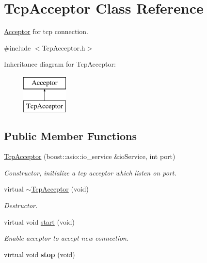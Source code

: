 \hypertarget{class_tcp_acceptor}{\section{Tcp\-Acceptor Class Reference}
\label{class_tcp_acceptor}
}


\hyperlink{class_acceptor}{Acceptor} for tcp connection.  




{\ttfamily \#include $<$Tcp\-Acceptor.\-h$>$}

Inheritance diagram for Tcp\-Acceptor\-:\begin{figure}[H]
\begin{center}
\leavevmode
\includegraphics[height=2.000000cm]{class_tcp_acceptor}
\end{center}
\end{figure}
\subsection*{Public Member Functions}
\begin{DoxyCompactItemize}
\item 
\hyperlink{class_tcp_acceptor_a71bbd613ee35e20b7db858c173fd52c0}{Tcp\-Acceptor} (boost\-::asio\-::io\-\_\-service \&io\-Service, int port)
\begin{DoxyCompactList}\small\item\em Constructor, initialize a tcp acceptor which listen on port. \end{DoxyCompactList}\item 
\hypertarget{class_tcp_acceptor_affefddc37347a117e5a51dfe86cd781f}{virtual \hyperlink{class_tcp_acceptor_affefddc37347a117e5a51dfe86cd781f}{$\sim$\-Tcp\-Acceptor} (void)}\label{class_tcp_acceptor_affefddc37347a117e5a51dfe86cd781f}

\begin{DoxyCompactList}\small\item\em Destructor. \end{DoxyCompactList}\item 
virtual void \hyperlink{class_tcp_acceptor_aa3d7ee0f8878d8223f82e8fac5d30649}{start} (void)
\begin{DoxyCompactList}\small\item\em Enable acceptor to accept new connection. \end{DoxyCompactList}\item 
\hypertarget{class_tcp_acceptor_af2895639d37de0940765ac38c624e617}{virtual void {\bfseries stop} (void)}\label{class_tcp_acceptor_af2895639d37de0940765ac38c624e617}

\end{DoxyCompactItemize}
